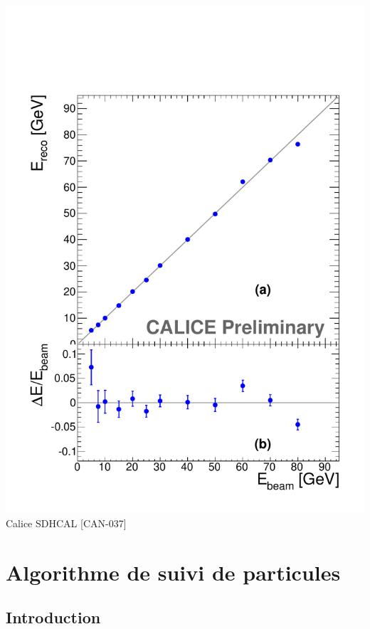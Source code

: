 \documentclass[8pt]{beamer}
\begin{document}
\begin{frame}
\begin{minipage}{0.5\linewidth}
\begin{center}
        \includegraphics[width=\linewidth]{Energy-Linearity.pdf} \\
        Calice SDHCAL [CAN-037]
      \end{center}
    \end{minipage}
  \end{frame}
  
  \section{Algorithme de suivi de particules}
  
  \begin{frame}
  \frametitle{\secname}
    \tableofcontents[currentsection]
  \end{frame}
  
  
  \subsection{Introduction}
  
\end{document}
